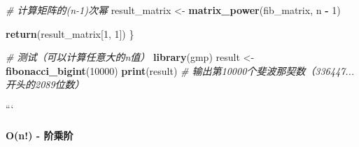 \documentclass[
]{book}
\newenvironment{Shaded}{\begin{snugshade}}{\end{snugshade}}
\newcommand{\CommentTok}[1]{\textcolor[rgb]{0.56,0.35,0.01}{\textit{#1}}}
\newcommand{\DecValTok}[1]{\textcolor[rgb]{0.00,0.00,0.81}{#1}}
\newcommand{\FunctionTok}[1]{\textcolor[rgb]{0.13,0.29,0.53}{\textbf{#1}}}
\newcommand{\NormalTok}[1]{#1}
\newcommand{\OtherTok}[1]{\textcolor[rgb]{0.56,0.35,0.01}{#1}}
\newcommand{\SpecialCharTok}[1]{\textcolor[rgb]{0.81,0.36,0.00}{\textbf{#1}}}
\begin{document}
\begin{itemize}
\begin{Shaded}
\begin{Highlighting}[]
  \CommentTok{\# 计算矩阵的(n{-}1)次幂}
\NormalTok{  result\_matrix }\OtherTok{\textless{}{-}} \FunctionTok{matrix\_power}\NormalTok{(fib\_matrix, n }\SpecialCharTok{{-}} \DecValTok{1}\NormalTok{)}

  \FunctionTok{return}\NormalTok{(result\_matrix[}\DecValTok{1}\NormalTok{, }\DecValTok{1}\NormalTok{])}
\NormalTok{\}}

\CommentTok{\# 测试（可以计算任意大的n值）}
\FunctionTok{library}\NormalTok{(gmp)}
\NormalTok{result }\OtherTok{\textless{}{-}} \FunctionTok{fibonacci\_bigint}\NormalTok{(}\DecValTok{10000}\NormalTok{)}
\FunctionTok{print}\NormalTok{(result)  }\CommentTok{\# 输出第10000个斐波那契数（336447...开头的2089位数）}
\end{Highlighting}
\end{Shaded}

  ```
\end{itemize}

\hypertarget{on---ux9636ux4e58ux9636}{%
\paragraph{O(n!) - 阶乘阶}\label{on---ux9636ux4e58ux9636}}
\end{document}
